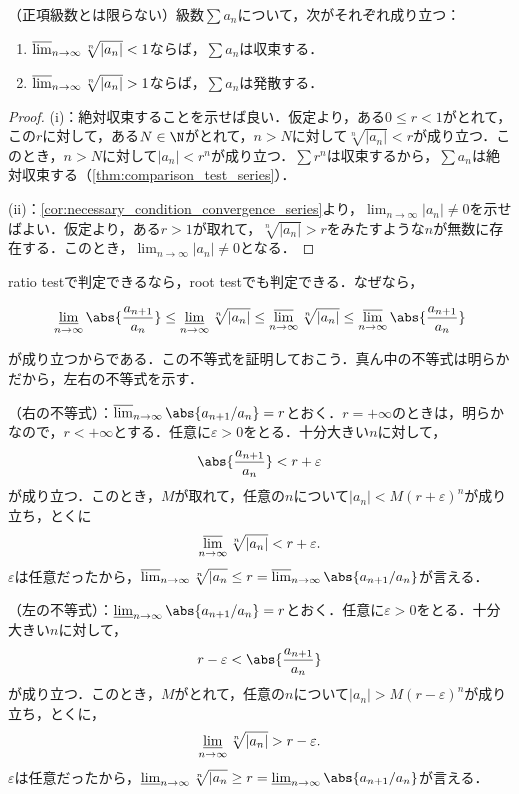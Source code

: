 \documentclass[a4paper,10pt]{ltjsarticle}
\begin{document}
\begin{MyTheorem}
  （正項級数とは限らない）級数\(\sum a_n\)について，次がそれぞれ成り立つ：
  \begin{enumerate}
    \item \(\varlimsup_{n\to\infty}\sqrt[n]{|a_n|} < 1\)ならば，\(\sum a_n\)は収束する．
    \item \(\varlimsup_{n\to\infty}\sqrt[n]{|a_n|} > 1\)ならば，\(\sum a_n\)は発散する．
  \end{enumerate}
\end{MyTheorem}
\begin{proof}
  (i)：絶対収束することを示せば良い．仮定より，ある\(0 \le r < 1\)がとれて，この\(r\)に対して，ある\(N \in \N\)がとれて，\(n > N\)に対して\(\sqrt[n]{|a_n|} < r\)が成り立つ．このとき，\(n > N\)に対して\(|a_n| < r^n\)が成り立つ．\(\sum r^n\)は収束するから，\(\sum a_n\)は絶対収束する（\cref{thm:comparison_test_series}）．

  (ii)：\cref{cor:necessary_condition_convergence_series}より，\(\lim_{n\to\infty}|a_n| \ne 0\)を示せばよい．仮定より，ある\(r > 1\)が取れて，\(\sqrt[n]{|a_n|} > r\)をみたすような\(n\)が無数に存在する．このとき，\(\lim_{n\to\infty}|a_n| \ne 0\)となる．
\end{proof}

ratio testで判定できるなら，root testでも判定できる．なぜなら，

\[ \varliminf_{n\to\infty}\abs{\frac{a_{n+1}}{a_n}} \le \varliminf_{n\to\infty}\sqrt[n]{|a_n|} \le \varlimsup_{n\to\infty}\sqrt[n]{|a_n|} \le \varlimsup_{n\to\infty}\abs{\frac{a_{n+1}}{a_n}} \]

が成り立つからである．この不等式を証明しておこう．真ん中の不等式は明らかだから，左右の不等式を示す．

（右の不等式）：\(\varlimsup_{n\to\infty}\abs{a_{n
      +1}/a_n} = r\)とおく．\(r = +\infty\)のときは，明らかなので，\(r < +\infty\)とする．任意に\(\varepsilon > 0\)をとる．十分大きい\(n\)に対して，
\[ \abs{\frac{a_{n+1}}{a_n}} < r + \varepsilon \]
が成り立つ．このとき，\(M\)が取れて，任意の\(n\)について\(|a_n| < M(r+\varepsilon)^n\)が成り立ち，とくに
\[ \varlimsup_{n\to\infty}\sqrt[n]{|a_n|} < r + \varepsilon. \]
\(\varepsilon\)は任意だったから，\(\varlimsup_{n\to\infty}\sqrt[n]{|a_n} \le r = \varlimsup_{n\to\infty}\abs{a_{n
      +1}/a_n}\)が言える．

（左の不等式）：\(\varliminf_{n\to\infty}\abs{a_{n
      +1}/a_n} = r\)とおく．任意に\(\varepsilon > 0\)をとる．十分大きい\(n\)に対して，
\[ r - \varepsilon < \abs{\frac{a_{n+1}}{a_n}} \]
が成り立つ．このとき，\(M\)がとれて，任意の\(n\)について\(|a_n| > M(r - \varepsilon)^n\)が成り立ち，とくに，
\[ \varliminf_{n\to\infty}\sqrt[n]{|a_n|} > r - \varepsilon. \]
\(\varepsilon\)は任意だったから，\(\varliminf_{n\to\infty}\sqrt[n]{|a_n} \ge r = \varliminf_{n\to\infty}\abs{a_{n
      +1}/a_n}\)が言える．
\end{document}
